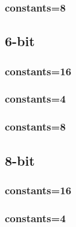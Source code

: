 \documentclass{article}
\begin{document}
\subsubsection*{constants=8}
\begin{figure}[H]
\centering
\resizebox{0.95\linewidth}{!}{}
\end{figure}
\subsection*{6-bit}
\subsubsection*{constants=16}
\begin{figure}[H]
\centering
\resizebox{0.95\linewidth}{!}{}
\end{figure}
\subsubsection*{constants=4}
\begin{figure}[H]
\centering
\resizebox{0.95\linewidth}{!}{}
\end{figure}
\subsubsection*{constants=8}
\begin{figure}[H]
\centering
\resizebox{0.95\linewidth}{!}{}
\end{figure}
\subsection*{8-bit}
\subsubsection*{constants=16}
\begin{figure}[H]
\centering
\resizebox{0.95\linewidth}{!}{}
\end{figure}
\subsubsection*{constants=4}
\begin{figure}[H]
\centering
\resizebox{0.95\linewidth}{!}{}
\end{figure}
\end{document}
